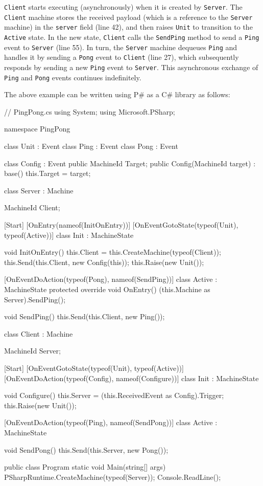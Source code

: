 \documentclass{llncs}
\newcommand{\ps}{P\#\xspace}
\newcommand{\cs}{C\#\xspace}
\begin{document}
\texttt{Client} starts executing (asynchronously) when it is created by \texttt{Server}. The \texttt{Client} machine stores the received payload (which is a reference to the \texttt{Server} machine) in the \texttt{server} field (line 42), and then raises \texttt{Unit} to transition to the \texttt{Active} state. In the new state, \texttt{Client} calls the \texttt{SendPing} method to send a \texttt{Ping} event to \texttt{Server} (line 55). In turn, the \texttt{Server} machine dequeues \texttt{Ping} and handles it by sending a \texttt{Pong} event to \texttt{Client} (line 27), which subsequently responds by sending a new \texttt{Ping} event to \texttt{Server}. This asynchronous exchange of \texttt{Ping} and \texttt{Pong} events continues indefinitely.

The above example can be written using \ps as a \cs library as follows:

\begin{psharp}
// PingPong.cs
using System;
using Microsoft.PSharp;

namespace PingPong {
  class Unit : Event { }
  class Ping : Event { }
  class Pong : Event { }
  
  class Config : Event {
    public MachineId Target;
    public Config(MachineId target) : base() {
      this.Target = target;
    }
  }
  
  class Server : Machine {
    MachineId Client;
    
    [Start]
    [OnEntry(nameof(InitOnEntry))]
    [OnEventGotoState(typeof(Unit), typeof(Active))]
    class Init : MachineState { }
    
    void InitOnEntry() {
      this.Client = this.CreateMachine(typeof(Client));
      this.Send(this.Client, new Config(this));
      this.Raise(new Unit());
    }
    
    [OnEventDoAction(typeof(Pong), nameof(SendPing))]
    class Active : MachineState {
      protected override void OnEntry() {
        (this.Machine as Server).SendPing();
      }
    }
    
    void SendPing() {
      this.Send(this.Client, new Ping());
    }
  }
  
  class Client : Machine {
    MachineId Server;
    
    [Start]
    [OnEventGotoState(typeof(Unit), typeof(Active))]
    [OnEventDoAction(typeof(Config), nameof(Configure))]
    class Init : MachineState { }
    
    void Configure() {
      this.Server = (this.ReceivedEvent as Config).Trigger;
      this.Raise(new Unit());
    }
    
    [OnEventDoAction(typeof(Ping), nameof(SendPong))]
    class Active : MachineState { }
    
    void SendPong() {
      this.Send(this.Server, new Pong());
    }
  }
  
  public class Program {
    static void Main(string[] args) {
      PSharpRuntime.CreateMachine(typeof(Server));
      Console.ReadLine();
    }
  }
}
\end{psharp}
\end{document}
